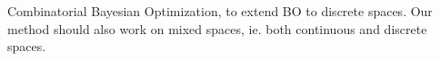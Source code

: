\documentclass[
    american,a4paper
    ]{scrartcl}
\newcommand{\lang}{en}
\begin{document}
        \begin{description}[style=unboxed]
            \item [\questionOne{\lang}] 
                Combinatorial Bayesian Optimization, to extend BO to discrete spaces.
                Our method should also work on mixed spaces, ie. both continuous and discrete spaces.


\end{description}
\end{document}
